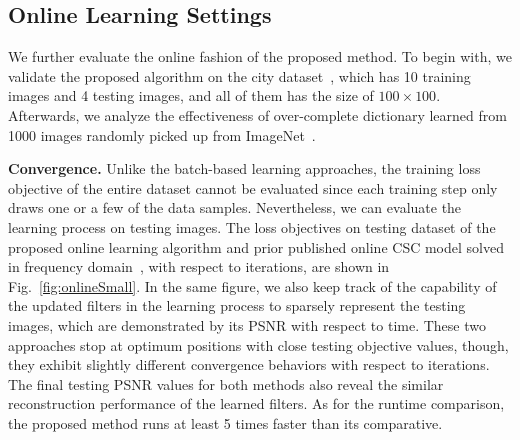 \subsection{Online Learning Settings}
We further evaluate the online fashion of the proposed method. To begin with, we validate the proposed algorithm on the city dataset~\citep{zeiler2010deconvolutional}, which has 10 training images and 4 testing images, and all of them has the size of $100 \times 100$. Afterwards, we analyze the effectiveness of over-complete dictionary learned from 1000 images randomly picked up from ImageNet~\cite{deng2009imagenet}.

{\bfseries Convergence.} Unlike the batch-based learning approaches, the training loss objective of the entire dataset cannot be evaluated since each training step only draws one or a few of the data samples. Nevertheless, we can evaluate the learning process on testing images. The loss objectives on testing dataset of the proposed online learning algorithm and prior published online CSC model solved in frequency domain~\citep{liu-2018-first}, with respect to iterations, are shown in Fig.~\ref{fig:onlineSmall}. In the same figure, we also keep track of the capability of the updated filters in the learning process to sparsely represent the testing images, which are demonstrated by its PSNR with respect to time. These two approaches stop at optimum positions with close testing objective values, though, they exhibit slightly different convergence behaviors with respect to iterations. The final testing PSNR values for both methods also reveal the similar reconstruction performance of the learned filters. As for the runtime comparison, the proposed method runs at least 5 times faster than its comparative.


